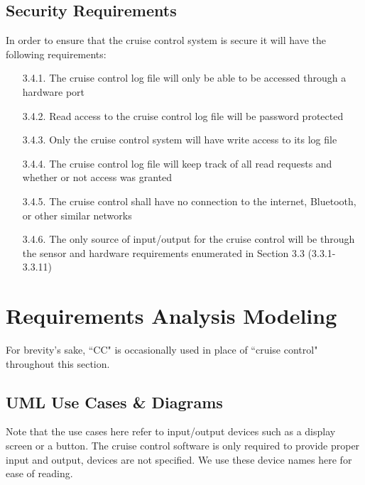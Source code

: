 \documentclass{article}
\begin{document}
	\subsection{Security Requirements}
	\indent\indent In order to ensure that the cruise control system is secure it will have the following requirements:
	\begin{enumerate}
		\item[3.4.1.] The cruise control log file will only be able to be accessed through a hardware port
		\item[3.4.2.] Read access to the cruise control log file will be password protected
		\item[3.4.3.] Only the cruise control system will have write access to its log file
		\item[3.4.4.] The cruise control log file will keep track of all read requests and whether or not access was granted
		\item[3.4.5.] The cruise control shall have no connection to the internet, Bluetooth, or other similar networks
		\item[3.4.6.] The only source of input/output for the cruise control will be through the sensor and hardware requirements enumerated in Section 3.3 (3.3.1-3.3.11)
	\end{enumerate}
	
	\newpage
	\section{Requirements Analysis Modeling}
	\indent\indent For brevity's sake, ``CC" is occasionally used in place of ``cruise control" throughout this section.
	
	\subsection{UML Use Cases \& Diagrams}
	\indent\indent Note that the use cases here refer to input/output devices such as a display screen or a button. The cruise control software is only required to provide proper input and output, devices are not specified. We use these device names here for ease of reading.
\end{document}
